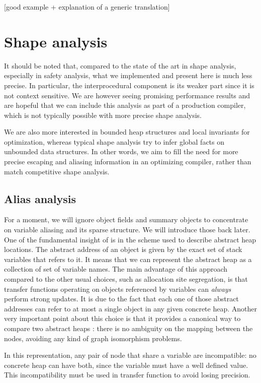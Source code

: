 \documentclass[11pt]{article}
\begin{document}
[good example + explanation of a generic translation]

\section*{Shape analysis}

It should be noted that, compared to the state of the art in shape analysis, especially in safety analysis, what we implemented and present here is much less precise.
In particular, the interprocedural component is its weaker part since it is not context sensitive.
We are however seeing promising performance results and are hopeful that we can include this analysis as part of a production compiler, which is not typically possible with more precise shape analysis.

We are also more interested in bounded heap structures and local invariants for optimization, whereas typical shape analysis try to infer global facts on unbounded data structures. In other words, we aim to fill the need for more precise escaping and aliasing information in an optimizing compiler, rather than match competitive shape analysis.

\subsection*{Alias analysis}
For a moment, we will ignore object fields and summary objects to concentrate on variable aliasing and its sparse structure. We will introduce those back later.
One of the fundamental insight of \cite{ssc} is in the scheme used to describe abstract heap locations.
The abstract address of an object is given by the exact set of stack variables that refers to it.
It means that we can represent the abstract heap as a collection of set of variable names.
The main advantage of this approach compared to the other usual choices, such as allocation site segregation, is that transfer functions operating on objects referenced by variables can \emph{always} perform strong updates.
It is due to the fact that each one of those abstract addresses can refer to at most a single object in any given concrete heap.
Another very important point about this choice is that it provides a canonical way to compare two abstract heaps : there is no ambiguity on the mapping between the nodes, avoiding any kind of graph isomorphism problems.

In this representation, any pair of node that share a variable are incompatible: no concrete heap can have both, since the variable must have a well defined value.
This incompatibility must be used in transfer function to avoid losing precision.
\end{document}
